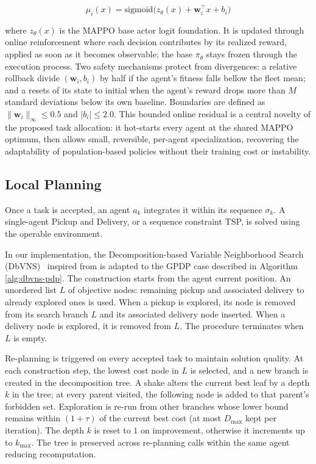 \documentclass[sigconf]{acmart}
\begin{document}
\begin{equation}
\mu_i(x) = \mathrm{sigmoid}\!\bigl(z_\theta(x) + \mathbf{w}_i^\top x + b_i\bigr)
\label{eq:specialization_logits}
\end{equation}

where $z_\theta(x)$ is the MAPPO base actor logit foundation. It is updated through online reinforcement where each decision contributes by its realized reward, applied as soon as it becomes observable; the base $\pi_\theta$ stays frozen through the execution process. Two safety mechanisms protect from divergences: a relative rollback divide $(\mathbf{w}_i, b_i)$ by half if the agent's fitness falls bellow the fleet mean; and a resets of its state to initial when the agent's reward drops more than $M$ standard deviations below its own baseline. Boundaries are defined as $\|\mathbf{w}_i\|_\infty \le 0.5$ and $|b_i| \le 2.0$. This bounded online residual is a central novelty of the proposed task allocation: it hot-starts every agent at the shared MAPPO optimum, then allows small, reversible, per-agent specialization, recovering the adaptability of population-based policies without their training cost or instability.
 
\subsection{Local Planning}
 
Once a task is accepted, an agent $a_k$ integrates it within its sequence $\sigma_k$. A single-agent Pickup and Delivery, or a sequence constraint TSP, is solved using the operable environment.
 
In our implementation, the Decomposition-based Variable Neighborhood Search (DbVNS)~\cite{crepin2026} inspired from \cite{mladenovic1997} is adapted to the GPDP case described in Algorithm \ref{alg:dbvns-pdp}. The construction starts from the agent current position. An unordered list $L$ of objective nodes: remaining pickup and associated delivery to already explored ones is used. When a pickup is explored, its node is removed from its search branch $L$ and its associated delivery node inserted. When a delivery node is explored, it is removed from $L$. The procedure terminates when $L$ is empty.

Re-planning is triggered on every accepted task to maintain solution quality. At each construction step, the lowest cost node in $L$ is selected, and a new branch is created in the decomposition tree. A shake alters the current best leaf by a depth $k$ in the tree; at every parent visited, the following node is added to that parent's forbidden set. Exploration is re-run from other branches whose lower bound remains within $(1+\tau)$ of the current best cost (at most $D_{\max}$ kept per iteration). The depth $k$ is reset to $1$ on improvement, otherwise it increments up to $k_{\max}$. The tree is preserved across re-planning calls within the same agent reducing recomputation.
 
\end{document}
